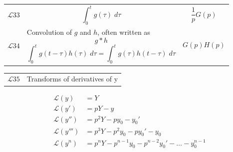 \documentclass[../main.tex]{subfiles}
\begin{document}
\begin{longtable}{m{}m{}  m{}m{}|}
        \vspace*{-0.15cm}
        \[\mathcal{L}33\] &\multicolumn{1}{p{0.4\textwidth}}{\centering \[\int_{0}^{t }g(\tau)\;d\tau \]} & \multicolumn{2}{p{0.4\textwidth}}{\centering \[ \frac{1}{p}G(p)\]}\\

        \vspace*{0.1cm}
        \[\mathcal{L}34\] & \multicolumn{1}{p{0.4\textwidth}}{\centering Convolution of \(g\) and \(h\), often written as \[g*h\]
        \[ \int_{0}^{t}g(t-\tau)h(\tau)\;d\tau= \int_{0}^{t}g(\tau)h(t-\tau)\;d\tau\]} & \multicolumn{2}{p{0.4\textwidth}}{\centering \[ G(p)H(p)\]}\\
        \end{longtable}
        \begin{longtable}{m{}m{}  m{}m{}|}
            \[\mathcal{L}35\] &\multicolumn{3}{p{1\textwidth}}{ Transforms of derivatives of y }\\
        \end{longtable}
        \begin{align*}
            \mathcal{L}(y)&=Y\\
            \mathcal{L}(y') &= pY - y\\
            \mathcal{L}(y'') &= p^2Y -p y_0-y_0'\\
            \mathcal{L}(y''') &= p^3Y -p^2y_0-py_0'-y_0\\
            \mathcal{L}(y^n) &= p^nY -p^{n-1} y_0-p^{n-2}y_0'-\dots-y_0^{n-1}\\
        \end{align*}
\end{document}
